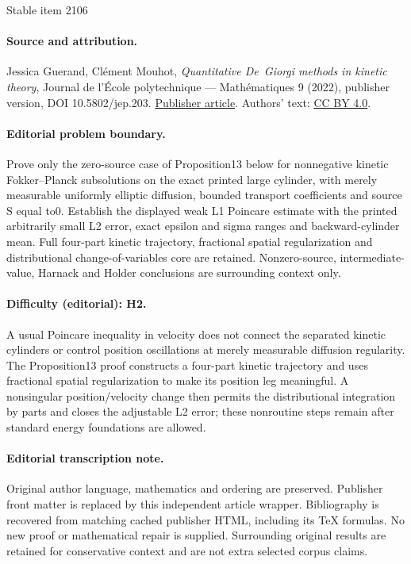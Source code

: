 \documentclass[11pt]{article}
\numberwithin{equation}{section}\let\oldbigcup\bigcup
\theoremstyle{definition}
\theoremstyle{remark}
\begin{document}
\begin{center}{\Large Stable item 2106}\end{center}
\paragraph{Source and attribution.}
Jessica Guerand, Clément Mouhot, \emph{Quantitative De Giorgi methods in kinetic theory}, Journal de l’École polytechnique — Mathématiques 9 (2022), publisher version, DOI 10.5802/jep.203. \href{https://jep.centre-mersenne.org/articles/10.5802/jep.203/}{Publisher article}. Authors' text: \href{https://creativecommons.org/licenses/by/4.0/}{CC BY 4.0}.
\paragraph{Editorial problem boundary.}
Prove only the zero-source case of Proposition13 below for nonnegative kinetic Fokker–Planck subsolutions on the exact printed large cylinder, with merely measurable uniformly elliptic diffusion, bounded transport coefficients and source S equal to0. Establish the displayed weak L1 Poincare estimate with the printed arbitrarily small L2 error, exact epsilon and sigma ranges and backward-cylinder mean. Full four-part kinetic trajectory, fractional spatial regularization and distributional change-of-variables core are retained. Nonzero-source, intermediate-value, Harnack and Holder conclusions are surrounding context only.
\paragraph{Difficulty (editorial): H2.}
A usual Poincare inequality in velocity does not connect the separated kinetic cylinders or control position oscillations at merely measurable diffusion regularity. The Proposition13 proof constructs a four-part kinetic trajectory and uses fractional spatial regularization to make its position leg meaningful. A nonsingular position/velocity change then permits the distributional integration by parts and closes the adjustable L2 error; these nonroutine steps remain after standard energy foundations are allowed.
\paragraph{Editorial transcription note.}
Original author language, mathematics and ordering are preserved. Publisher front matter is replaced by this independent article wrapper. Bibliography is recovered from matching cached publisher HTML, including its TeX formulas. No new proof or mathematical repair is supplied. Surrounding original results are retained for conservative context and are not extra selected corpus claims.
\clearpage
\end{document}

